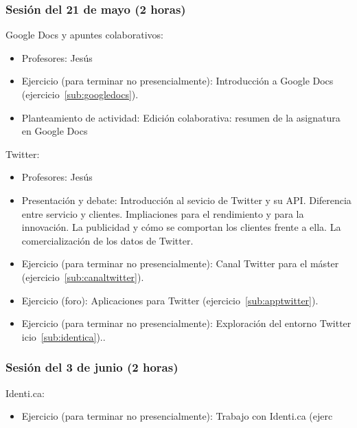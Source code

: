 \documentclass[a4paper,12pt]{article}
\begin{document}
\subsubsection{Sesión del 21 de mayo (2 horas)}

Google Docs y apuntes colaborativos:

\begin{itemize}
\item Profesores: Jesús
\item Ejercicio (para terminar no presencialmente): Introducción a Google Docs (ejercicio~\ref{sub:googledocs}).
\item Planteamiento de actividad: Edición colaborativa: resumen de la asignatura en Google Docs
\end{itemize}

Twitter:

\begin{itemize}
\item Profesores: Jesús
\item Presentación y debate: Introducción al sevicio de Twitter y su API. Diferencia entre servicio y clientes. Impliaciones para el rendimiento y para la innovación. La publicidad y cómo se comportan los clientes frente a ella. La comercialización de los datos de Twitter.
\item Ejercicio (para terminar no presencialmente): Canal Twitter para el máster (ejercicio~\ref{sub:canaltwitter}).
\item Ejercicio (foro): Aplicaciones para Twitter (ejercicio~\ref{sub:apptwitter}).
\item Ejercicio (para terminar no presencialmente): Exploración del entorno Twitter
icio~\ref{sub:identica})..
\end{itemize}

\subsubsection{Sesión del 3 de junio (2 horas)}

Identi.ca:

\begin{itemize}
\item Ejercicio (para terminar no presencialmente): Trabajo con Identi.ca (ejerc
\end{itemize}

\end{document}
